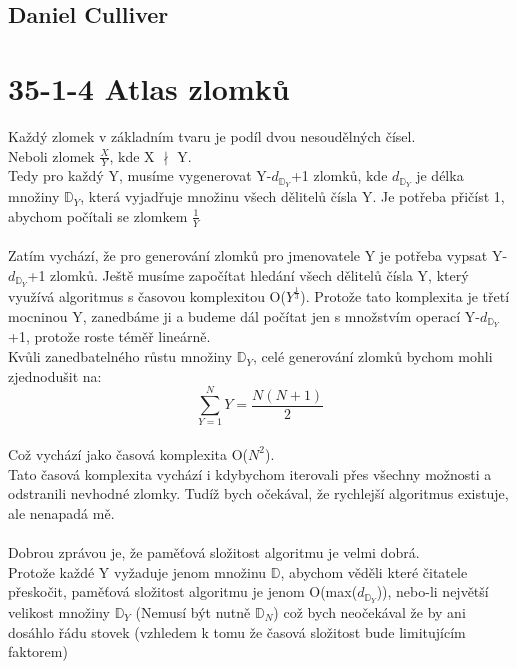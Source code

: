 \documentclass[12pt]{article}
\begin{document}
\subsection*{Daniel Culliver}
\section*{35-1-4 Atlas zlomků}

Každý zlomek v základním tvaru je podíl dvou nesoudělných čísel.
\\
Neboli zlomek $\frac{X}{Y}$, kde X $\nmid$ Y.
\\
Tedy pro každý Y, musíme vygenerovat Y-$d_{\mathbb{D}_Y}$+1 zlomků, 
kde $d_{\mathbb{D}_Y}$ je délka množiny $\mathbb{D}_Y$, která vyjadřuje množinu všech dělitelů čísla Y.
Je potřeba přičíst 1, abychom počítali se zlomkem $\frac{1}{Y}$
\\
\\
Zatím vychází, že pro generování zlomků pro jmenovatele Y je potřeba vypsat Y-$d_{\mathbb{D}_Y}$+1 zlomků.
Ještě musíme započítat hledání všech dělitelů čísla Y, který využívá algoritmus s časovou komplexitou O($Y^{\frac{1}{3}}$).
Protože tato komplexita je třetí mocninou Y, zanedbáme ji a budeme dál počítat jen s množstvím operací Y-$d_{\mathbb{D}_Y}$+1, protože roste téměř lineárně.
\\
Kvůli zanedbatelného růstu množiny $\mathbb{D}_Y$, celé generování zlomků bychom mohli zjednodušit na:
\[
  \sum_{Y=1}^{N} Y = \frac{N(N+1)}{2}
\]
\\
Což vychází jako časová komplexita O($N^{2}$).
\\
Tato časová komplexita vychází i kdybychom iterovali přes všechny možnosti a odstranili nevhodné zlomky.
Tudíž bych očekával, že rychlejší algoritmus existuje, ale nenapadá mě.
\\
\\
Dobrou zprávou je, že paměťová složitost algoritmu je velmi dobrá.
\\
Protože každé Y vyžaduje jenom množinu $\mathbb{D}$, abychom věděli které čitatele přeskočit,
paměťová složitost algoritmu je jenom O(max($d_{\mathbb{D}_Y}$)),
nebo-li největší velikost množiny $\mathbb{D}_Y$ (Nemusí být nutně $\mathbb{D}_N$)
což bych neočekával že by ani dosáhlo řádu stovek (vzhledem k tomu že časová složitost bude limitujícím faktorem)
\end{document}
